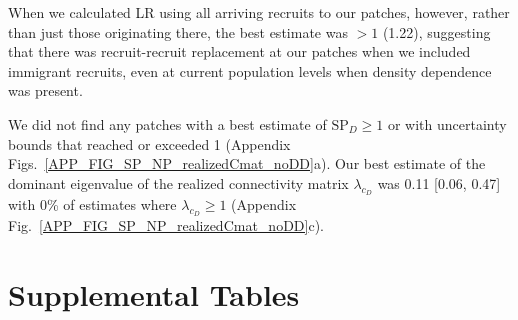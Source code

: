 \documentclass[12pt, oneside]{article}   	%
\begin{document}
When we calculated LR using all arriving recruits to our patches, however, rather than just those originating there, the best estimate was $> 1$ (1.22), suggesting that there was recruit-recruit replacement at our patches when we included immigrant recruits, even at current population levels when density dependence was present.

We did not find any patches with a best estimate of $\text{SP}_{D} \geq 1$ or with uncertainty bounds that reached or exceeded 1 (Appendix Figs.\ \ref{APP_FIG_SP_NP_realizedCmat_noDD}a). Our best estimate of the dominant eigenvalue of the realized connectivity matrix $\lambda_{c_{D}}$ was 0.11 [0.06, 0.47] with 0\% of estimates where $\lambda_{c_{D}} \geq 1$ (Appendix Fig.\ \ref{APP_FIG_SP_NP_realizedCmat_noDD}c). 

\newpage{}
\section{Supplemental Tables} \label{APP_SEC_TABLES}
\end{document}
